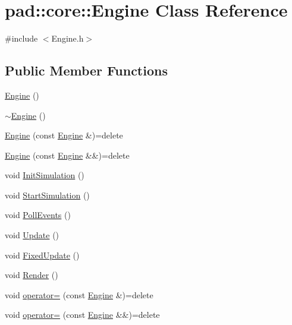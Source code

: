 \hypertarget{classpad_1_1core_1_1_engine}{}\section{pad\+:\+:core\+:\+:Engine Class Reference}
\label{classpad_1_1core_1_1_engine}


{\ttfamily \#include $<$Engine.\+h$>$}

\subsection*{Public Member Functions}
\begin{DoxyCompactItemize}
\item 
\mbox{\hyperlink{classpad_1_1core_1_1_engine_a21cbbda47294efd9577f2326e296987d}{Engine}} ()
\item 
\mbox{\hyperlink{classpad_1_1core_1_1_engine_a089f48932c1ab79c75038293be84be4d}{$\sim$\+Engine}} ()
\item 
\mbox{\hyperlink{classpad_1_1core_1_1_engine_a7f3a2054a58b7c517b6344e4f7d3caa1}{Engine}} (const \mbox{\hyperlink{classpad_1_1core_1_1_engine}{Engine}} \&)=delete
\item 
\mbox{\hyperlink{classpad_1_1core_1_1_engine_aba083d4c42ed225c5d4c7fdc01aa6304}{Engine}} (const \mbox{\hyperlink{classpad_1_1core_1_1_engine}{Engine}} \&\&)=delete
\item 
void \mbox{\hyperlink{classpad_1_1core_1_1_engine_a274487d5412979070f6e4f549a2228f7}{Init\+Simulation}} ()
\item 
void \mbox{\hyperlink{classpad_1_1core_1_1_engine_a02dfcdfa4826c9ae9ee18d16d22c0e33}{Start\+Simulation}} ()
\item 
void \mbox{\hyperlink{classpad_1_1core_1_1_engine_aba81039388bc6e284f25b19fcb227b0e}{Poll\+Events}} ()
\item 
void \mbox{\hyperlink{classpad_1_1core_1_1_engine_afd5238cc10483197dfce90523d26cfd2}{Update}} ()
\item 
void \mbox{\hyperlink{classpad_1_1core_1_1_engine_ae2b0a14fcc29187791d656214846fcd6}{Fixed\+Update}} ()
\item 
void \mbox{\hyperlink{classpad_1_1core_1_1_engine_a6fb2ea7ace95d697e53d336eed279ace}{Render}} ()
\item 
void \mbox{\hyperlink{classpad_1_1core_1_1_engine_aa97a489c1f1212d3e58f66ce1a49fb48}{operator=}} (const \mbox{\hyperlink{classpad_1_1core_1_1_engine}{Engine}} \&)=delete
\item 
void \mbox{\hyperlink{classpad_1_1core_1_1_engine_a410aa3ba5bd595d7831a41e9dc4470fa}{operator=}} (const \mbox{\hyperlink{classpad_1_1core_1_1_engine}{Engine}} \&\&)=delete
\end{DoxyCompactItemize}
